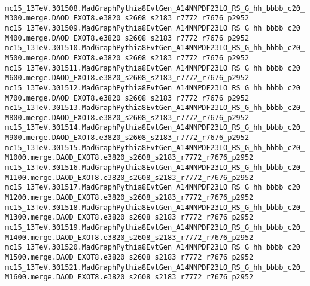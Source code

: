 \noindent
\\
{\tiny
\verb|mc15_13TeV.301508.MadGraphPythia8EvtGen_A14NNPDF23LO_RS_G_hh_bbbb_c20_M300.merge.DAOD_EXOT8.e3820_s2608_s2183_r7772_r7676_p2952|\\
\verb|mc15_13TeV.301509.MadGraphPythia8EvtGen_A14NNPDF23LO_RS_G_hh_bbbb_c20_M400.merge.DAOD_EXOT8.e3820_s2608_s2183_r7772_r7676_p2952|\\
\verb|mc15_13TeV.301510.MadGraphPythia8EvtGen_A14NNPDF23LO_RS_G_hh_bbbb_c20_M500.merge.DAOD_EXOT8.e3820_s2608_s2183_r7772_r7676_p2952|\\
\verb|mc15_13TeV.301511.MadGraphPythia8EvtGen_A14NNPDF23LO_RS_G_hh_bbbb_c20_M600.merge.DAOD_EXOT8.e3820_s2608_s2183_r7772_r7676_p2952|\\
\verb|mc15_13TeV.301512.MadGraphPythia8EvtGen_A14NNPDF23LO_RS_G_hh_bbbb_c20_M700.merge.DAOD_EXOT8.e3820_s2608_s2183_r7772_r7676_p2952|\\
\verb|mc15_13TeV.301513.MadGraphPythia8EvtGen_A14NNPDF23LO_RS_G_hh_bbbb_c20_M800.merge.DAOD_EXOT8.e3820_s2608_s2183_r7772_r7676_p2952|\\
\verb|mc15_13TeV.301514.MadGraphPythia8EvtGen_A14NNPDF23LO_RS_G_hh_bbbb_c20_M900.merge.DAOD_EXOT8.e3820_s2608_s2183_r7772_r7676_p2952|\\
\verb|mc15_13TeV.301515.MadGraphPythia8EvtGen_A14NNPDF23LO_RS_G_hh_bbbb_c20_M1000.merge.DAOD_EXOT8.e3820_s2608_s2183_r7772_r7676_p2952|\\
\verb|mc15_13TeV.301516.MadGraphPythia8EvtGen_A14NNPDF23LO_RS_G_hh_bbbb_c20_M1100.merge.DAOD_EXOT8.e3820_s2608_s2183_r7772_r7676_p2952|\\
\verb|mc15_13TeV.301517.MadGraphPythia8EvtGen_A14NNPDF23LO_RS_G_hh_bbbb_c20_M1200.merge.DAOD_EXOT8.e3820_s2608_s2183_r7772_r7676_p2952|\\
\verb|mc15_13TeV.301518.MadGraphPythia8EvtGen_A14NNPDF23LO_RS_G_hh_bbbb_c20_M1300.merge.DAOD_EXOT8.e3820_s2608_s2183_r7772_r7676_p2952|\\
\verb|mc15_13TeV.301519.MadGraphPythia8EvtGen_A14NNPDF23LO_RS_G_hh_bbbb_c20_M1400.merge.DAOD_EXOT8.e3820_s2608_s2183_r7772_r7676_p2952|\\
\verb|mc15_13TeV.301520.MadGraphPythia8EvtGen_A14NNPDF23LO_RS_G_hh_bbbb_c20_M1500.merge.DAOD_EXOT8.e3820_s2608_s2183_r7772_r7676_p2952|\\
\verb|mc15_13TeV.301521.MadGraphPythia8EvtGen_A14NNPDF23LO_RS_G_hh_bbbb_c20_M1600.merge.DAOD_EXOT8.e3820_s2608_s2183_r7772_r7676_p2952|\\
}
